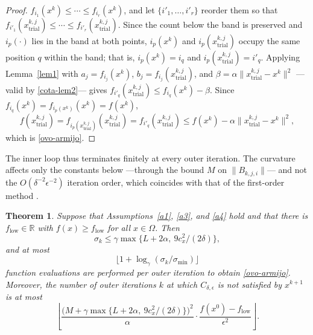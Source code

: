 \documentclass[11pt]{article}
\newcommand{\xkjtrial}{x^{k,j}_{\mathrm{trial}}}
\newcommand{\flow}{f_{\mathrm{low}}}
\newtheorem{theorem}{Theorem}[section]
\begin{document}
\begin{proof}
$f_{i_1}(x^k) \leq \cdots \leq f_{i_r}(x^k)$, and let
$\{i'_1, \ldots, i'_r\}$ reorder them so that
$f_{i'_1}(\xkjtrial) \leq \cdots \leq f_{i'_r}(\xkjtrial)$. Since the count below
the band is preserved and $i_p(\cdot)$ lies in the band at both points,
$i_p(x^k)$ and $i_p(\xkjtrial)$ occupy the same position $q$ within the band;
that is, $i_p(x^k) = i_q$ and $i_p(\xkjtrial) = i'_q$. Applying
Lemma~\ref{lem1} with $a_j = f_{i_j}(x^k)$, $b_j = f_{i_j}(\xkjtrial)$, and
$\beta = \alpha\|\xkjtrial - x^k\|^2$ ---valid by \eqref{cota-lem2}--- gives
$f_{i'_q}(\xkjtrial) \leq f_{i_q}(x^k) - \beta$. Since
$f_{i_q}(x^k) = f_{i_p(x^k)}(x^k) = f(x^k)$,
\[
f(\xkjtrial) = f_{i_p(\xkjtrial)}(\xkjtrial) = f_{i'_q}(\xkjtrial)
\leq f(x^k) - \alpha \|\xkjtrial - x^k\|^2,
\]
which is \eqref{ovo-armijo}.
\end{proof}

The inner loop thus terminates finitely at every outer iteration. The curvature
affects only the constants below ---through the bound $M$ on $\|B_{k,j,i}\|$--- and
not the $O(\delta^{-2}\epsilon^{-2})$ iteration order, which coincides with that
of the first-order method \cite{alvarezovo}.

\begin{theorem} \label{teo:complexity}
Suppose that Assumptions~\ref{a1}, \ref{a3}, and \ref{a4} hold and that there is
$\flow \in \mathbb{R}$ with $f(x) \geq \flow$ for all $x \in \Omega$. Then
\begin{equation} \label{cota-sigma}
\sigma_k \leq \gamma \max\{ L + 2\alpha,\ 9c_x^2/(2\delta) \},
\end{equation}
and at most
\begin{equation} \label{cota-fcnt}
\big\lfloor 1 + \log_\gamma( \sigma_k / \sigma_{\min} ) \big\rfloor
\end{equation}
function evaluations are performed per outer iteration to obtain
\eqref{ovo-armijo}. Moreover, the number of outer iterations $k$ at which
$C_{\delta,\epsilon}$ is not satisfied by $x^{k+1}$ is at most
\begin{equation} \label{cota-iter}
\left\lfloor \frac{\big( M + \gamma \max\{ L + 2\alpha,\ 9c_x^2/(2\delta) \}
\big)^2}{\alpha} \cdot \frac{f(x^0) - \flow}{\epsilon^2} \right\rfloor.
\end{equation}
\end{theorem}
\end{document}
